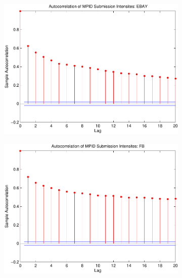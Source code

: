 \documentclass{article}
\begin{document}
\begin{figure}[htp!]
\begin{subfigure}{0.24\textwidth}
\includegraphics[width=\linewidth]{docs/Graphs_MPID_SUB_RATIO_EBAY_30sec_FullTime.pdf}
\end{subfigure}
\begin{subfigure}{0.24\textwidth}
\includegraphics[width=\linewidth]{docs/Graphs_MPID_SUB_RATIO_FB_30sec_FullTime.pdf}
\end{subfigure}


\end{figure}
\end{document}

